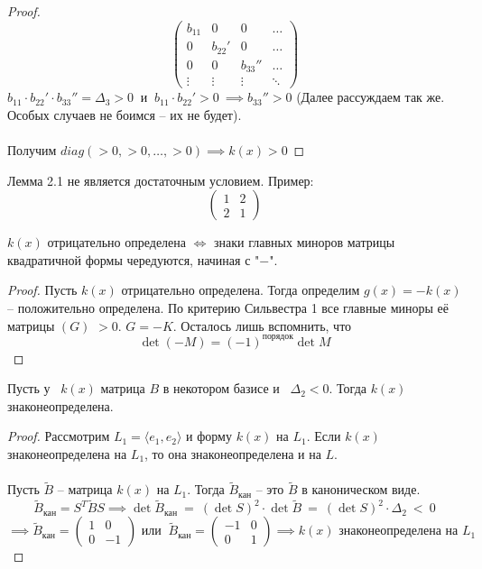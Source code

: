 \documentclass[11pt]{article}
\begin{document}
\begin{proof}
  \[\begin{pmatrix}
    b_{11} & 0 & 0 & \dots \\
    0 & b_{22}' & 0 & \dots \\ 
    0 & 0 & b_{33}'' & \dots \\
    \vdots & \vdots & \vdots & \ddots
  \end{pmatrix}\]
  $b_{11} \cdot b_{22}' \cdot b_{33}'' = \Delta_3 > 0 \ \text{ и } \ 
  b_{11} \cdot b_{22}' > 0 \ \implies b_{33}'' > 0$ (Далее рассуждаем 
  так же. Особых случаев не боимся -- их не будет). \\ \\
  Получим $diag(>0, >0, \ldots, >0) \implies k(x) > 0$
\end{proof}

\begin{remark}
  Лемма 2.1 не является достаточным условием. Пример:
   \[\begin{pmatrix}
    1 & 2 \\
    2 & 1
  \end{pmatrix}\]
\end{remark}

\begin{theorem}
  $k(x)$ отрицательно определена $\Longleftrightarrow$ знаки главных 
  миноров матрицы квадратичной формы чередуются, начиная с "$-$".
\end{theorem}

\begin{proof}
  Пусть $k(x)$ отрицательно определена. Тогда определим $g(x) = - 
  k(x)$ -- положительно определена. По критерию Сильвестра 1 все 
  главные миноры её матрицы $(G)$ $> 0$. $G = -K$. Осталось лишь 
  вспомнить, что 
  \[\det (-M) = (-1)^{\text{порядок}} \det M\]
\end{proof}

\begin{theorem}
  Пусть у \ $k(x)$ матрица $B$ в некотором базисе и \ $\Delta_2 < 0$. 
  Тогда $k(x)$ знаконеопределена.
\end{theorem}

\begin{proof}
  Рассмотрим $L_1 = \langle e_1, e_2 \rangle$ и форму $k(x)$ на $L_1$.
  Если $k(x)$ знаконеопределена на $L_1$, то она знаконеопределена и 
  на $L$. \\ \\
  Пусть $\widetilde{B}$ -- матрица $k(x)$ на $L_1$. Тогда 
  $\widetilde{B}_{\text{кан}}$ -- это $\widetilde{B}$ в каноническом 
  виде. \[\widetilde{B}_{\text{кан}} = S^T\widetilde{B}S \implies 
  \det \widetilde{B}_{\text{кан}} \ = \ (\det S)^2 \cdot \det 
  \widetilde{B} \ = \ (\det S)^2 \cdot \Delta_2 \ < \ 0\]
  \[\implies \widetilde{B}_{\text{кан}} = 
  \begin{pmatrix}
    1 & 0 \\
    0 & -1
  \end{pmatrix} \text{ или } \ \widetilde{B}_{\text{кан}} = 
  \begin{pmatrix}
    -1 & 0 \\
    0 & 1
  \end{pmatrix} \implies k(x) \text{ знаконеопределена на } L_1\]
\end{proof}
\end{document}
